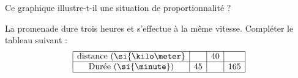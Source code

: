 
\begin{exercice}\label{exosmath-0948}

Ce graphique illustre-t-il une situation de proportionnalité ?

\begin{center}
   
\end{center}

La promenade dure trois heures et s'effectue à la même vitesse. Compléter le tableau suivant :
\begin{equation*}
    \begin{array}[]{|c|c|c|c|}
        \hline
        \text{distance (\si{\kilo\meter}}&&40&\\
          \hline
          \text{Durée (\si{\minute})}&45&&165\\
          \hline
    \end{array}
\end{equation*}

\end{exercice}
